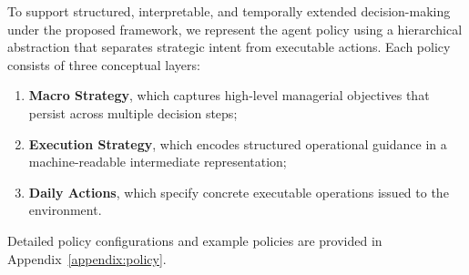 To support structured, interpretable, and temporally extended decision-making under the proposed framework, we represent the agent policy using a hierarchical abstraction that separates strategic intent from executable actions. Each policy consists of three conceptual layers:
\begin{enumerate}[leftmargin=*]
    \item \textbf{Macro Strategy}, which captures high-level managerial objectives that persist across multiple decision steps;
    \item \textbf{Execution Strategy}, which encodes structured operational guidance in a machine-readable intermediate representation;
    \item \textbf{Daily Actions}, which specify concrete executable operations issued to the environment.
\end{enumerate}
Detailed policy configurations and example policies are provided in Appendix~\ref{appendix:policy}.
